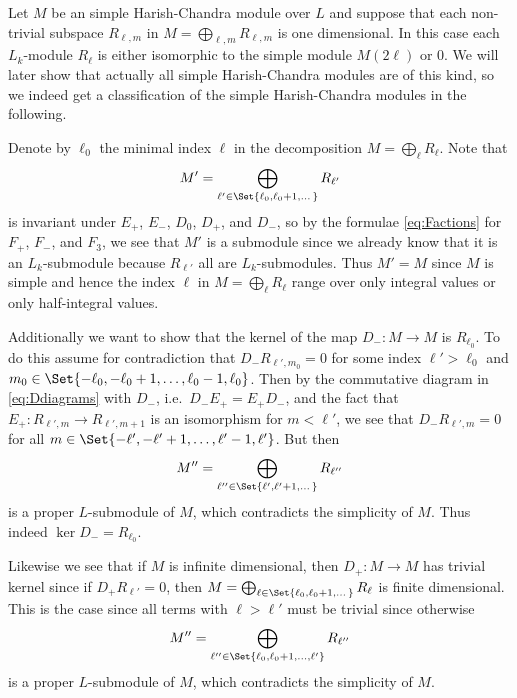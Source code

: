 Let $M$ be an simple Harish-Chandra module over $L$ and suppose that each non-trivial subspace $R_{\ell,m}$ in $M=\bigoplus_{\ell,m} R_{\ell,m}$ is one dimensional. In this case each $L_k$-module $R_\ell$ is either isomorphic to the simple module $M(2\ell)$ or $0$. We will later show that actually all simple Harish-Chandra modules are of this kind, so we indeed get a classification of the simple Harish-Chandra modules in the following.

Denote by $\ell_0$ the minimal index $\ell$ in the decomposition $M=\bigoplus_\ell R_\ell$. Note that
\begin{align*}
  M' = \bigoplus_{\ell'\in\Set{\ell_0,\ell_0+1,\dotsc}} R_{\ell'}
\end{align*}
is invariant under $E_+$, $E_-$, $D_0$, $D_+$, and $D_-$, so by the formulae \cref{eq:Factions} for $F_+$, $F_-$, and $F_3$, we see that $M'$ is a submodule since we already know that it is an $L_k$-submodule because $R_{\ell'}$ all are $L_k$-submodules. Thus $M'=M$ since $M$ is simple and hence the index $\ell$ in $M=\bigoplus_\ell R_\ell$ range over only integral values or only half-integral values.

Additionally we want to show that the kernel of the map $D_-\colon M\to M$ is $R_{\ell_0}$. To do this assume for contradiction that $D_-R_{\ell',m_0}=0$ for some index $\ell'>\ell_0$ and $m_0\in\Set{-\ell_0,-\ell_0+1,\dotsc,\ell_0-1,\ell_0}$. Then by the commutative diagram in \cref{eq:Ddiagrams} with $D_-$, i.e.\ $D_-E_+=E_+D_-$, and the fact that $E_+\colon R_{\ell',m}\to R_{\ell',m+1}$ is an isomorphism for $m<\ell'$, we see that $D_-R_{\ell',m}=0$ for all $m\in\Set{-\ell',-\ell'+1,\dotsc,\ell'-1,\ell'}$. But then
\begin{align*}
  M'' = \bigoplus_{\ell''\in\Set{\ell',\ell'+1,\dotsc}} R_{\ell''}
\end{align*}
is a proper $L$-submodule of $M$, which contradicts the simplicity of $M$. Thus indeed $\ker D_- = R_{\ell_0}$.

Likewise we see that if $M$ is infinite dimensional, then $D_+\colon M\to M$ has trivial kernel since if $D_+R_{\ell'}=0$, then $M=\bigoplus_{\ell\in\Set{\ell_0,\ell_0+1,\dotsc}} R_{\ell}$ is finite dimensional. This is the case since all terms with $\ell>\ell'$ must be trivial since otherwise
\begin{align*}
  M'' = \bigoplus_{\ell''\in\Set{\ell_0,\ell_0+1,\dotsc,\ell'}} R_{\ell''}
\end{align*}
is a proper $L$-submodule of $M$, which contradicts the simplicity of $M$.

